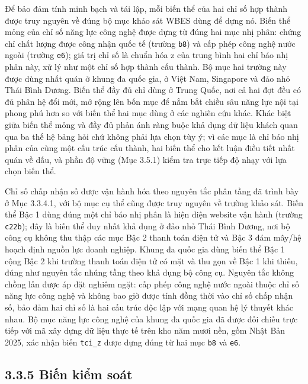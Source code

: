\documentclass[
  a4paper,
  13pt]{extreport}
\begin{document}
Để bảo đảm tính minh bạch và tái lập, mỗi biến thể của hai chỉ số hợp
thành được truy nguyên về đúng bộ mục khảo sát WBES dùng để dựng nó.
Biến thể mỏng của chỉ số năng lực công nghệ được dựng từ đúng hai mục
nhị phân: chứng chỉ chất lượng được công nhận quốc tế (trường
\texttt{b8}) và cấp phép công nghệ nước ngoài (trường \texttt{e6}); giá
trị chỉ số là chuẩn hóa z của trung bình hai chỉ báo nhị phân này, xử lý
như một chỉ số hợp thành cấu thành. Bộ mục hai trường này được dùng nhất
quán ở khung đa quốc gia, ở Việt Nam, Singapore và đảo nhỏ Thái Bình
Dương. Biến thể đầy đủ chỉ dùng ở Trung Quốc, nơi cả hai đợt đều có đủ
phân hệ đổi mới, mở rộng lên bốn mục để nắm bắt chiều sâu năng lực nội
tại phong phú hơn so với biến thể hai mục dùng ở các nghiên cứu khác.
Khác biệt giữa biến thể mỏng và đầy đủ phản ánh ràng buộc khả dụng dữ
liệu khách quan qua ba thế hệ bảng hỏi chứ không phải lựa chọn tùy ý; vì
các mục là chỉ báo nhị phân của cùng một cấu trúc cấu thành, hai biến
thể cho kết luận điều tiết nhất quán về dấu, và phần độ vững (Mục 3.5.1)
kiểm tra trực tiếp độ nhạy với lựa chọn biến thể.

Chỉ số chấp nhận số được vận hành hóa theo nguyên tắc phân tầng đã trình
bày ở Mục 3.3.4.1, với bộ mục cụ thể cũng được truy nguyên về trường
khảo sát. Biến thể Bậc 1 dùng đúng một chỉ báo nhị phân là hiện diện
website vận hành (trường \texttt{c22b}); đây là biến thể duy nhất khả
dụng ở đảo nhỏ Thái Bình Dương, nơi bộ công cụ không thu thập các mục
Bậc 2 thanh toán điện tử và Bậc 3 đám mây/hệ hoạch định nguồn lực doanh
nghiệp. Khung đa quốc gia dùng biến thể Bậc 1 cộng Bậc 2 khi trường
thanh toán điện tử có mặt và thu gọn về Bậc 1 khi thiếu, đúng như nguyên
tắc nhúng tầng theo khả dụng bộ công cụ. Nguyên tắc không chồng lấn được
áp đặt nghiêm ngặt: cấp phép công nghệ nước ngoài thuộc chỉ số năng lực
công nghệ và không bao giờ được tính đồng thời vào chỉ số chấp nhận số,
bảo đảm hai chỉ số là hai cấu trúc độc lập với mạng quan hệ lý thuyết
khác nhau. Bộ mục năng lực công nghệ của khung đa quốc gia đã được đối
chiếu trực tiếp với mã xây dựng dữ liệu thực tế trên kho năm mươi nền,
gồm Nhật Bản 2025, xác nhận biến \texttt{tci\_z} được dựng đúng từ hai
mục \texttt{b8} và \texttt{e6}.

\hypertarget{biux1ebfn-kiux1ec3m-souxe1t}{%
\subsection{3.3.5 Biến kiểm soát}\label{biux1ebfn-kiux1ec3m-souxe1t}}
\end{document}
